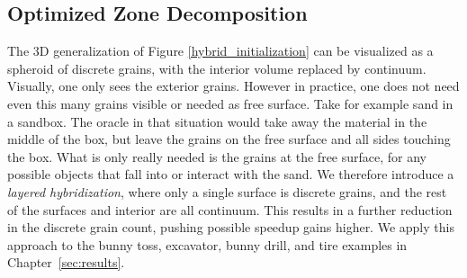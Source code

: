 \subsection{Optimized Zone Decomposition}
\label{sec:layered_3D}
The 3D generalization of Figure \ref{hybrid_initialization} can be visualized as a spheroid of discrete grains, with the interior volume replaced by continuum. Visually, one only sees the exterior grains. However in practice, one does not need even this many grains visible or needed as free surface. Take for example sand in a sandbox. The oracle in that situation would take away the material in the middle of the box, but leave the grains on the free surface and all sides touching the box. What is only really needed is the grains at the free surface, for any possible objects that fall into or interact with the sand. We therefore introduce a \textit{layered hybridization}, where only a single surface is discrete grains, and the rest of the surfaces and interior are all continuum. This results in a further reduction in the discrete grain count, pushing possible speedup gains higher. We apply this approach to the bunny toss, excavator, bunny drill, and tire examples in Chapter~\ref{sec:results}.
%
%
